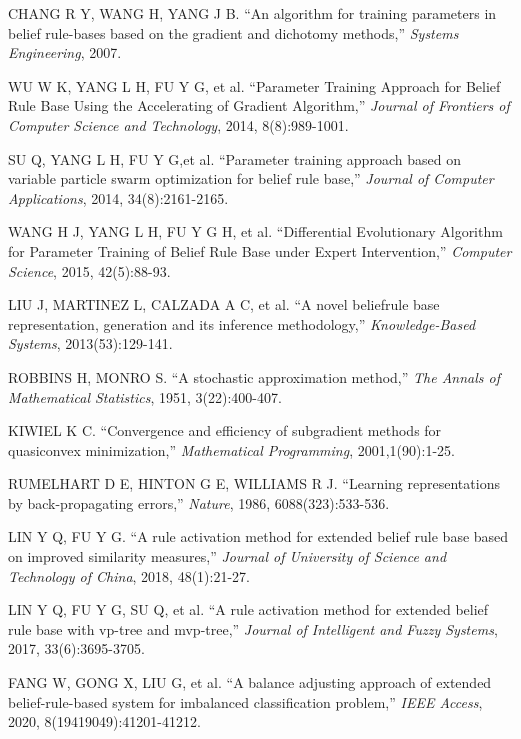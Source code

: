 \documentclass{ieeeaccess}
\begin{document}
\begin{thebibliography}{00}
     CHANG R Y, WANG H, YANG J B. ``An algorithm for training parameters
    in belief rule-bases based on the gradient and dichotomy methods,''
    \emph{Systems Engineering},
    2007.

     WU W K, YANG L H, FU Y G, et al. ``Parameter Training Approach for Belief Rule Base Using the Accelerating of Gradient
    Algorithm,''
    \emph{Journal of Frontiers of Computer Science and Technology},
    2014, 8(8):989-1001.

     SU Q, YANG L H, FU Y G,et al. ``Parameter training approach based on variable particle swarm optimization
    for belief rule base,''
    \emph{Journal of Computer Applications},
    2014, 34(8):2161-2165.

     WANG H J, YANG L H, FU Y G H, et al. ``Differential Evolutionary Algorithm for Parameter Training of Belief Rule Base under Expert Intervention,''
    \emph{Computer Science},
    2015, 42(5):88-93.

     LIU J, MARTINEZ L, CALZADA A C, et al. ``A novel beliefrule base representation, generation and its inference methodology,''
    \emph{Knowledge-Based Systems},
    2013(53):129-141.

     ROBBINS H, MONRO S. ``A stochastic approximation method,''
    \emph{The Annals of Mathematical Statistics},
    1951, 3(22):400-407.

     KIWIEL K C. ``Convergence and efficiency of subgradient methods for quasiconvex minimization,''
    \emph{Mathematical Programming},
    2001,1(90):1-25.

     RUMELHART D E, HINTON G E, WILLIAMS R J. ``Learning representations
    by back-propagating errors,''
    \emph{Nature},
    1986, 6088(323):533-536.

     LIN Y Q, FU Y G. ``A rule activation method for extended belief rule base based on improved similarity measures,''
    \emph{Journal of University of Science and Technology of China},
    2018, 48(1):21-27.

     LIN Y Q, FU Y G, SU Q, et al. ``A rule activation method for extended
    belief rule base with vp-tree and mvp-tree,''
    \emph{Journal of Intelligent and Fuzzy Systems},
    2017, 33(6):3695-3705.

     FANG W, GONG X, LIU G, et al. ``A balance adjusting approach of extended
    belief-rule-based system for imbalanced classification problem,''
    \emph{IEEE Access},
    2020, 8(19419049):41201-41212.


\end{thebibliography}
\end{document}

